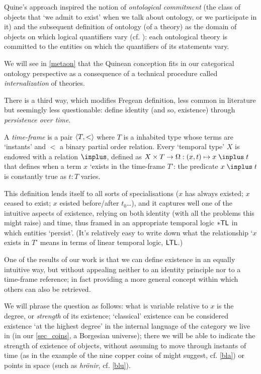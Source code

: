Quine's approach inspired the notion of \emph{ontological commitment} (the class of objects that `we admit to exist' when we talk about ontology, or we participate in it) and the subsequent definition of ontology (of a theory) as the domain of objects on which logical quantifiers vary (cf. \cite{Qui53}): each ontological theory is committed to the entities on which the quantifiers of its statements vary.

We will see in \autoref{metaon} that the Quinean conception fits in our categorical ontology perspective as a consequence of a technical procedure called \emph{internalization} of theories.

There is a third way, which modifies Fregean definition, less common in literature but seemingly less questionable: define identity (and so, existence) through \emph{persistence over time}.

A \emph{time-frame} is a pair $\langle T, <\rangle$ where $T$ is a inhabited type whose terms are `instants' and $<$ a binary partial order relation. Every `temporal type' $X$ is endowed with a relation $\inplus$, defined as $X\times T \to\Omega : (x, t) \mapsto x \mathrel \inplus t $ that defines when a term $x$ `exists in the time-frame $T$': the predicate $x\mathrel\inplus t$ is constantly true as $t:T$ varies.

This definition lends itself to all sorts of specialisations ($x$ has always existed; $x$ ceased to exist; $x$ esisted before/after $t_0$\dots), and it captures well one of the intuitive aspects of existence, relying on both identity (with all the problems this might raise) and time, thus framed in an appropriate temporal logic $\sf *TL$ in which entities `persist'. (It's relatively easy to write down what the relationship `$x$ exists in $T$' means in terms of linear temporal logic, $\sf LTL$.)

One of the results of our work is that we can define existence in an equally intuitive way, but without appealing neither to an identity principle nor to a time-frame reference; in fact providing a more general concept within which others can also be retrieved.

We will phrase the question as follows: what is variable relative to $x$ is the degree, or \emph{strength} of its existence; `classical' existence can be considered existence `at the highest degree' in the internal language of the category we live in (in our \autoref{sec_coins}, a Borgesian universe); there we will be able to indicate the strength of existence of objects, without assuming to move through instants of time (as in the example of the nine copper coins of \cite{tlonEN} might suggest, cf. \autoref{bla}) or points in space (such as \emph{hr\"onir}, cf. \autoref{blu}).

